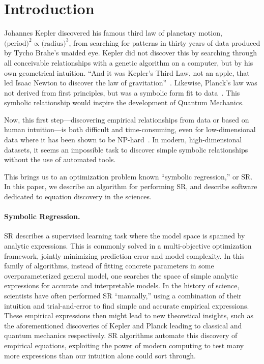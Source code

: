 \documentclass[letterpaper,twocolumn]{scrartcl}
\begin{document}
\addtocounter{footnote}{-1}
\addtocounter{footnote}{1}







\section{Introduction}
\label{sec:intro_pysr}








Johannes Kepler discovered his famous third law of planetary motion, $\text{(period)}^2 \propto \text{(radius)}^3$, from searching for patterns in thirty years of data produced by Tycho Brahe's unaided eye.
Kepler did not discover this by searching through all conceivable relationships with a genetic algorithm on a computer, but by his own geometrical intuition. 
``And it was Kepler's Third Law, not an apple, that led Isaac Newton to discover the law of gravitation''~\cite{hawkingShouldersGiantsGreat2004}.
Likewise, Planck's law was not derived from first principles, but was a symbolic form fit to data~\cite{planckUeberVerbesserungWien1900}.
This symbolic relationship would inspire the development of Quantum Mechanics.

Now, this first step---discovering empirical relationships from data or based on human intuition---is both difficult and time-consuming, even for low-dimensional data where it has been shown to be NP-hard~\cite{virgolinSymbolicRegressionNPhard2022}.
In modern, high-dimensional datasets, it seems an impossible task to discover simple symbolic relationships without the use of automated tools.

This brings us to an optimization problem known ``symbolic regression,'' or SR.
In this paper, we describe an algorithm for performing SR, and describe software dedicated to equation discovery in the sciences.

\paragraph{Symbolic Regression.}
SR describes a supervised learning task where the model space is spanned by analytic expressions.
This is commonly solved in a multi-objective optimization framework, jointly minimizing prediction error and model complexity.
In this family of algorithms, instead of fitting concrete parameters in some overparameterized general model, one searches the space of simple analytic expressions for accurate and interpretable models.
In the history of science, scientists have often performed SR ``manually,'' using a combination of their intuition and trial-and-error to find simple and accurate empirical expressions.
These empirical expressions then might lead to new theoretical insights, such as the aforementioned discoveries of Kepler and Planck leading to classical and quantum mechanics respectively.
SR algorithms automate this discovery of empirical equations, exploiting the power of modern computing to test many more expressions than our intuition alone could sort through.
\end{document}
